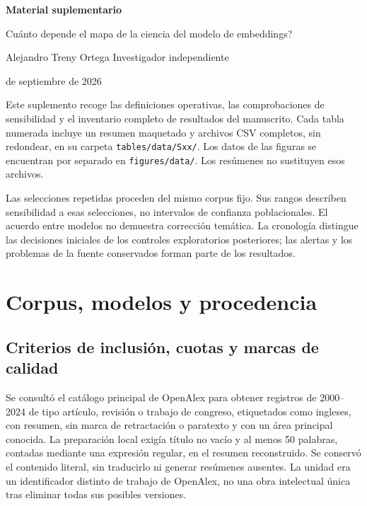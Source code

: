 \documentclass[12pt]{article}
\begin{document}
\begin{center}
{\LARGE\bfseries Material suplementario\par}
\medskip
{\large \textquestiondown{}Cuánto depende el mapa de la ciencia del modelo de embeddings?\par}
\medskip
Alejandro Treny Ortega \textbullet{} Investigador independiente\par
{} de septiembre de 2026
\end{center}
Este suplemento recoge las definiciones operativas, las comprobaciones de sensibilidad y el inventario completo de resultados del manuscrito. Cada tabla numerada incluye un resumen maquetado y archivos CSV completos, sin redondear, en su carpeta \nolinkurl{tables/data/Sxx/}. Los datos de las figuras se encuentran por separado en \nolinkurl{figures/data/}. Los resúmenes no sustituyen esos archivos.

Las selecciones repetidas proceden del mismo corpus fijo. Sus rangos describen sensibilidad a esas selecciones, no intervalos de confianza poblacionales. El acuerdo entre modelos no demuestra corrección temática. La cronología distingue las decisiones iniciales de los controles exploratorios posteriores; las alertas y los problemas de la fuente conservados forman parte de los resultados.
\medskip
{\small{}\setcounter{tocdepth}{1}\tableofcontents}
\clearpage

\section{Corpus, modelos y procedencia}
\subsection{Criterios de inclusión, cuotas y marcas de calidad}
Se consultó el catálogo principal de OpenAlex para obtener registros de 2000--2024 de tipo artículo, revisión o trabajo de congreso, etiquetados como ingleses, con resumen, sin marca de retractación o paratexto y con un área principal conocida. La preparación local exigía título no vacío y al menos 50 palabras, contadas mediante una expresión regular, en el resumen reconstruido. Se conservó el contenido literal, sin traducirlo ni generar resúmenes ausentes. La unidad era un identificador distinto de trabajo de OpenAlex, no una obra intelectual única tras eliminar todas sus posibles versiones.
\end{document}
